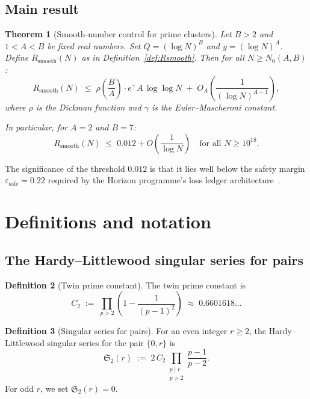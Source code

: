 \documentclass[11pt,reqno]{amsart}
\theoremstyle{plain}
\newtheorem{theorem}{Theorem}[section]
\theoremstyle{definition}
\newtheorem{definition}[theorem]{Definition}
\theoremstyle{remark}
\newcommand{\Rsmooth}{R_{\mathrm{smooth}}}
\newcommand{\Sfrak}{\mathfrak{S}_2}
\newcommand{\eps}{\varepsilon}
\begin{document}
\subsection{Main result}

\begin{theorem}[Smooth-number control for prime clusters]\label{thm:main}
Let $B > 2$ and $1 < A < B$ be fixed real numbers. Set
$Q = (\log N)^B$ and $y = (\log N)^A$. Define $\Rsmooth(N)$ as
in Definition~\ref{def:Rsmooth}. Then for all $N \ge N_0(A,B)$:
\[
  \Rsmooth(N) \;\le\;
  \rho\!\left(\frac{B}{A}\right) \cdot e^{\gamma}\, A\, \log\log N
  \;+\; O_{A}\!\left(\frac{1}{(\log N)^{A-1}}\right),
\]
where $\rho$ is the Dickman function and $\gamma$ is the
Euler--Mascheroni constant.

In particular, for $A = 2$ and $B = 7$:
\[
  \Rsmooth(N) \;\le\; 0.012 + O\!\left(\frac{1}{\log N}\right)
  \quad\text{for all } N \ge 10^{18}.
\]
\end{theorem}

The significance of the threshold $0.012$ is that it lies well below
the safety margin $\eps_{\mathrm{safe}} = 0.22$ required by the
Horizon programme's loss ledger architecture~\cite{G36}.

\section{Definitions and notation}\label{sec:defs}

\subsection{The Hardy--Littlewood singular series for pairs}

\begin{definition}[Twin prime constant]\label{def:C2}
The twin prime constant is
\[
  C_2 \;:=\; \prod_{p > 2} \left(1 - \frac{1}{(p-1)^2}\right)
  \;\approx\; 0.6601618\ldots
\]
\end{definition}

\begin{definition}[Singular series for pairs]\label{def:S2}
For an even integer $r \ge 2$, the Hardy--Littlewood singular series
for the pair $\{0, r\}$ is
\begin{equation}\label{eq:S2}
  \Sfrak(r) \;:=\; 2\, C_2 \prod_{\substack{p \mid r \\ p > 2}}
  \frac{p-1}{p-2}.
\end{equation}
For odd $r$, we set $\Sfrak(r) = 0$.
\end{definition}
\end{document}
